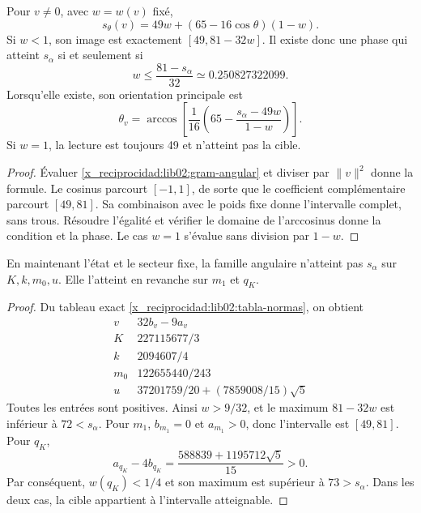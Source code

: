 \begin{proposition}
\label{x_reciprocidad:lib02:alcanzabilidad}
Pour \(v\ne0\), avec \(w=w(v)\) fixé,
\[
 s_\theta(v)=49w+(65-16\cos\theta)(1-w).
\]
Si \(w<1\), son image est exactement
\([49,81-32w]\). Il existe donc une phase qui atteint
\(s_\alpha\) si et seulement si
\[
 w\leq\frac{81-s_\alpha}{32}\simeq0.250827322099.
\]
Lorsqu'elle existe, son orientation principale est
\[
 \theta_v=\arccos\left[
 \frac1{16}\left(65-\frac{s_\alpha-49w}{1-w}\right)\right].
\]
Si \(w=1\), la lecture est toujours 49 et n'atteint pas la cible.
\end{proposition}
\begin{proof}
Évaluer \eqref{x_reciprocidad:lib02:gram-angular} et diviser par \(\|v\|^2\)
donne la formule. Le cosinus parcourt \([-1,1]\), de sorte que le
coefficient complémentaire parcourt \([49,81]\). Sa combinaison avec
le poids fixe donne l’intervalle complet, sans trous. Résoudre l’égalité
et vérifier le domaine de l’arccosinus donne la condition et la phase.
Le cas \(w=1\) s’évalue sans division par \(1-w\).
\end{proof}

\begin{corollary}
\label{x_reciprocidad:lib02:seis-angulares}
En maintenant l'état et le secteur fixe, la famille angulaire n'atteint pas \(s_\alpha\) sur \(K,k,m_0,u\). Elle l'atteint en revanche sur \(m_1\) et \(q_K\).
\end{corollary}
\begin{proof}
Du tableau exact \eqref{x_reciprocidad:lib02:tabla-normas}, on obtient
\[
\begin{array}{c|c}
 v&32b_v-9a_v\\\hline
 K&227115677/3\\
 k&2094607/4\\
 m_0&122655440/243\\
 u&37201759/20+(7859008/15)\sqrt5
\end{array}
\]
Toutes les entrées sont positives. Ainsi \(w>9/32\), et le maximum \(81-32w\) est inférieur à \(72<s_\alpha\). Pour \(m_1\), \(b_{m_1}=0\) et \(a_{m_1}>0\), donc l'intervalle est \([49,81]\). Pour \(q_K\),
\[
 a_{q_K}-4b_{q_K}=\frac{588839+1195712\sqrt5}{15}>0.
\]
Par conséquent, \(w(q_K)<1/4\) et son maximum est supérieur à
\(73>s_\alpha\). Dans les deux cas, la cible appartient à
l’intervalle atteignable.
\end{proof}

